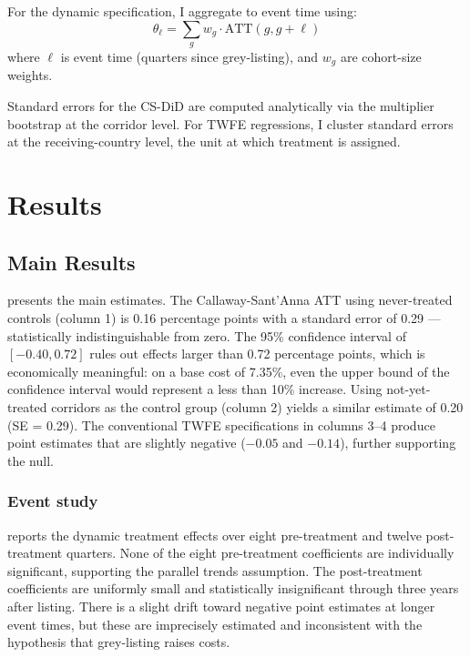 \documentclass[12pt]{article}
\begin{document}
For the dynamic specification, I aggregate to event time using:
\begin{equation}
\theta_\ell = \sum_{g} w_g \cdot \text{ATT}(g, g + \ell)
\end{equation}
where $\ell$ is event time (quarters since grey-listing), and $w_g$ are cohort-size weights.

Standard errors for the CS-DiD are computed analytically via the multiplier bootstrap at the corridor level. For TWFE regressions, I cluster standard errors at the receiving-country level, the unit at which treatment is assigned.


\section{Results}

\subsection{Main Results}

 presents the main estimates. The Callaway-Sant'Anna ATT using never-treated controls (column 1) is 0.16 percentage points with a standard error of 0.29 --- statistically indistinguishable from zero. The 95\% confidence interval of $[-0.40, 0.72]$ rules out effects larger than 0.72 percentage points, which is economically meaningful: on a base cost of 7.35\%, even the upper bound of the confidence interval would represent a less than 10\% increase. Using not-yet-treated corridors as the control group (column 2) yields a similar estimate of 0.20 (SE = 0.29). The conventional TWFE specifications in columns 3--4 produce point estimates that are slightly negative ($-0.05$ and $-0.14$), further supporting the null.



\subsubsection*{Event study}  reports the dynamic treatment effects over eight pre-treatment and twelve post-treatment quarters. None of the eight pre-treatment coefficients are individually significant, supporting the parallel trends assumption. The post-treatment coefficients are uniformly small and statistically insignificant through three years after listing. There is a slight drift toward negative point estimates at longer event times, but these are imprecisely estimated and inconsistent with the hypothesis that grey-listing raises costs.
\end{document}
